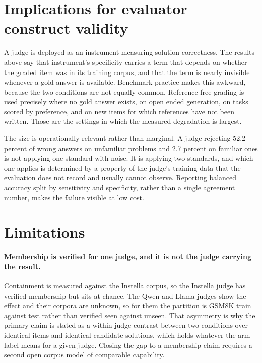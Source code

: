 \section{Implications for evaluator construct validity}

A judge is deployed as an instrument measuring solution correctness. The results above say
that instrument's specificity carries a term that depends on whether the graded item was in
its training corpus, and that the term is nearly invisible whenever a gold answer is
available. Benchmark practice makes this awkward, because the two conditions are not equally
common. Reference free grading is used precisely where no gold answer exists, on open ended
generation, on tasks scored by preference, and on new items for which references have not
been written. Those are the settings in which the measured degradation is largest.

The size is operationally relevant rather than marginal. A judge rejecting 52.2 percent of
wrong answers on unfamiliar problems and 2.7 percent on familiar ones is not applying one
standard with noise. It is applying two standards, and which one applies is determined by a
property of the judge's training data that the evaluation does not record and usually cannot
observe. Reporting balanced accuracy split by sensitivity and specificity, rather than a
single agreement number, makes the failure visible at low cost.

\section{Limitations}
\label{sec:limits}

\paragraph{Membership is verified for one judge, and it is not the judge carrying the
result.} Containment is measured against the Instella corpus, so the Instella judge has
verified membership but sits at chance. The Qwen and Llama judges show the effect and their
corpora are unknown, so for them the partition is GSM8K train against test rather than
verified seen against unseen. That asymmetry is why the primary claim is stated as a within
judge contrast between two conditions over identical items and identical candidate
solutions, which holds whatever the arm label means for a given judge. Closing the gap to a
membership claim requires a second open corpus model of comparable capability.

